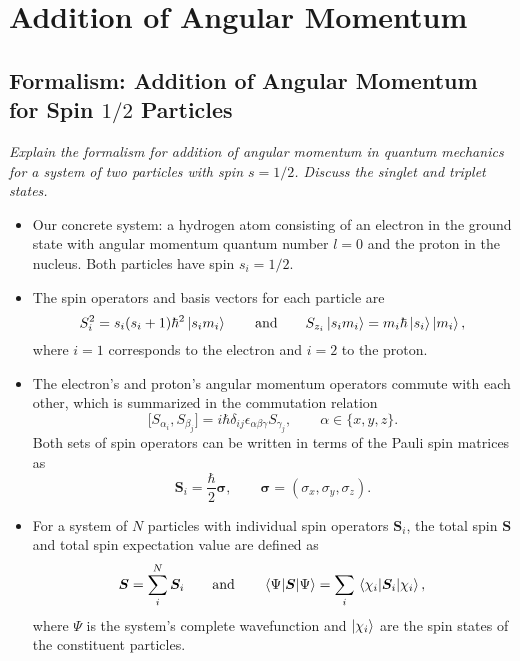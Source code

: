 \documentclass[11pt, a4paper]{article}
\newcommand{\eqtext}[1]{\qquad \text{#1} \qquad}
\renewcommand{\vec}[1]{\bm{#1}}  %
\renewcommand{\S}{\vec{S}}  %
\renewcommand{\P}{\Psi}  %
\begin{document}
\newpage
\section{Addition of Angular Momentum}

\subsection{Formalism: Addition of Angular Momentum for Spin $ 1/2 $ Particles}
\textit{Explain the formalism for addition of angular momentum in quantum mechanics for a system of two particles with spin $ s = 1/2 $. Discuss the singlet and triplet states.}
\begin{itemize}
	\item Our concrete system: a hydrogen atom consisting of an electron in the ground state with angular momentum quantum number $ l = 0 $ and the proton in the nucleus. Both particles have spin $ s_{i} = 1/2 $.

    \item The spin operators and basis vectors for each particle are
	\begin{equation*}
		S_{i}^{2} = s_{i}(s_{i} + 1)\hbar^{2}\ket{s_{i}m_{i}} \eqtext{and} S_{z_{i}}\ket{s_{i}m_{i}} = m_{i}\hbar \ket{s_{i}}\ket{m_{i}},
	\end{equation*}
	where $ i = 1 $ corresponds to the electron and $ i = 2 $ to the proton. 
	
	\item The electron's and proton's angular momentum operators commute with each other, which is summarized in the commutation relation
	\begin{equation*}
		\big[S_{\alpha_{i}}, S_{\beta_{j}}\big] = i \hbar \delta_{ij}\epsilon_{\alpha \beta \gamma}S_{\gamma_{j}}, \qquad \alpha \in \{x, y, z\}.
	\end{equation*}
	Both sets of spin operators can be written in terms of the Pauli spin matrices as
	\begin{equation*}
        \vec{S}_{i} = \frac{\hbar}{2}\vec{\sigma}, \qquad \vec{\sigma} = \left(\sigma_{x}, \sigma_{y}, \sigma_{z}\right).
	\end{equation*}
	
	\item For a system of $ N $ particles with individual spin operators $ \S_{i} $, the total spin $ \S $ and total spin expectation value are defined as
	\begin{equation*}
		\S = \sum_{i}^{N}\S_{i} \qquad \text{and} \qquad \mel{\P}{\S}{\P} = \sum_{i}\mel{\chi_{i}}{\S_{i}}{\chi_{i}},
	\end{equation*}
	where $ \P $ is the system's complete wavefunction and $ \ket{\chi_{i}} $ are the spin states of the constituent particles. 
	

\end{itemize}
\end{document}
